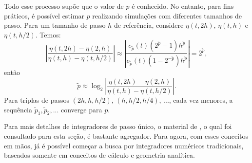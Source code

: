 Todo esse processo supõe que o valor de $p$ é conhecido. No entanto, para fins práticos, é possível estimar $p$ realizando simulações com diferentes tamanhos de passo. Para um tamanho de passo $h$ de referência, considere $\eta (t, 2h)$, $\eta (t, h)$ e $\eta (t, h/2)$. Temos:
\begin{equation*}
    \left|\dfrac{\eta(t, 2h) - \eta(2,h)}{\eta(t, h) - \eta(t, h/2)}\right|
    \approx
    \left| \dfrac{e_{\tilde p}(t) (2^{\tilde p} - 1) h^{\tilde p}}{e_{\tilde p} (t) (1-2^{-\tilde p}) h^{\tilde p}} \right| = 2^{\tilde p},
\end{equation*}
então
\begin{equation}\label{eq:aproximacao_ordem}
    \tilde p \approx \log_2{\left| \dfrac{\eta(t, 2h) - \eta(2,h)}{\eta(t, h) - \eta(t, h/2)} \right|}.
\end{equation}
Para triplas de passos $(2h, h, h/2)$, $(h,h/2,h/4)$, ..., cada vez menores, a sequência $\tilde p_1, \tilde p_2, ...$ converge para $p$.

Para mais detalhes de integradores de passo único, o material de \cite{alexandre_megiorin_roma_metodos_nodate}, o qual foi consultado para esta seção, é bastante agregador. Para agora, com esses conceitos em mãos, já é possível começar a busca por integradores numéricos tradicionais, baseados somente em conceitos de cálculo e geometria analítica.